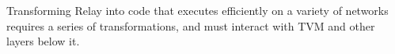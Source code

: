 




Transforming Relay into code that executes efficiently on a variety of networks requires a series of transformations, and must interact with TVM and other layers below it.
